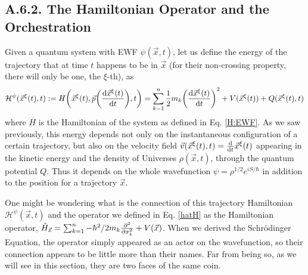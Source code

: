 \documentclass[11pt, a4paper]{article} %
\newcommand{\h}{\mathcal{H}}
\begin{document}

\subsection*{A.6.2. The Hamiltonian Operator and the Orchestration}
Given a quantum system with EWF $\psi(\vec{x},t)$, let us define the energy of the trajectory that at time $t$ happens to be in $\vec{x}$ (for their non-crossing property, there will only be one, the $\xi$-th), as
\begin{equation}
\h^\psi(\vec{x}^\xi(t), t):=H\qty(\vec{x}^\xi(t), \vec{p}\qty(\dv{\vec{x}^\xi(t)}{t}), t)=\sum_{k=1}^n \frac{1}{2}m_k\qty(\dv{\vec{x}^\xi(t)}{t})^2+V(\vec{x}^\xi(t))+Q(\vec{x}^\xi(t),t)
\end{equation}
where $H$ is the Hamiltonian of the system as defined in Eq. \eqref{H:EWF}. As we saw previously, this energy depends not only on the instantaneous configuration of a certain trajectory, but also on the velocity field $\vec{v}(\vec{x}^\xi(t),t)=\dv{}{t}\vec{x}^\xi(t)$ appearing in the kinetic energy and the density of Universes $\rho(\vec{x},t)$, through the quantum potential $Q$. Thus it depends on the whole wavefunction $\psi=\rho^{1/2}e^{iS/\hbar}$ in addition to the position for a trajectory $\vec{x}$.

One might be wondering what is the connection of this trajectory Hamiltonian $\h^\psi(\vec{x},t)$ and the operator we defined in Eq. \eqref{hatH} as the Hamiltonian operator, $\hat{H}_{\vec{x}}=\sum_{k=1}^n-\hbar^2/2m_k\pdv[2]{}{x_k}+V(\vec{x})$. When we derived the Schrödinger Equation, the operator simply appeared as an actor on the wavefunction, so their connection appears to be little more than their names. Far from being so, as we will see in this section, they are two faces of the same coin.
\end{document}
